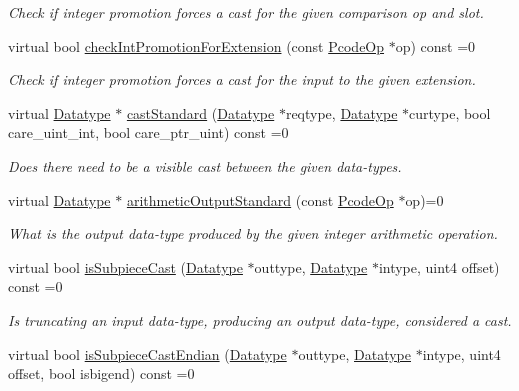 \begin{DoxyCompactItemize}
\begin{DoxyCompactList}\small\item\em Check if integer promotion forces a cast for the given comparison op and slot. \end{DoxyCompactList}\item 
virtual bool \mbox{\hyperlink{class_cast_strategy_a1d44ad4691a30115228ae37533d2c38d}{check\+Int\+Promotion\+For\+Extension}} (const \mbox{\hyperlink{class_pcode_op}{Pcode\+Op}} $\ast$op) const =0
\begin{DoxyCompactList}\small\item\em Check if integer promotion forces a cast for the input to the given extension. \end{DoxyCompactList}\item 
virtual \mbox{\hyperlink{class_datatype}{Datatype}} $\ast$ \mbox{\hyperlink{class_cast_strategy_a9ca9d31afeefca9a43cd8114333bcb21}{cast\+Standard}} (\mbox{\hyperlink{class_datatype}{Datatype}} $\ast$reqtype, \mbox{\hyperlink{class_datatype}{Datatype}} $\ast$curtype, bool care\+\_\+uint\+\_\+int, bool care\+\_\+ptr\+\_\+uint) const =0
\begin{DoxyCompactList}\small\item\em Does there need to be a visible cast between the given data-\/types. \end{DoxyCompactList}\item 
virtual \mbox{\hyperlink{class_datatype}{Datatype}} $\ast$ \mbox{\hyperlink{class_cast_strategy_ae1b79520df9f5b6dc22afb6969606054}{arithmetic\+Output\+Standard}} (const \mbox{\hyperlink{class_pcode_op}{Pcode\+Op}} $\ast$op)=0
\begin{DoxyCompactList}\small\item\em What is the output data-\/type produced by the given integer arithmetic operation. \end{DoxyCompactList}\item 
virtual bool \mbox{\hyperlink{class_cast_strategy_a1297e8653f09779c450e99ba43909e3a}{is\+Subpiece\+Cast}} (\mbox{\hyperlink{class_datatype}{Datatype}} $\ast$outtype, \mbox{\hyperlink{class_datatype}{Datatype}} $\ast$intype, uint4 offset) const =0
\begin{DoxyCompactList}\small\item\em Is truncating an input data-\/type, producing an output data-\/type, considered a cast. \end{DoxyCompactList}\item 
virtual bool \mbox{\hyperlink{class_cast_strategy_a349f166237fd4cd8f3d01b276a21138a}{is\+Subpiece\+Cast\+Endian}} (\mbox{\hyperlink{class_datatype}{Datatype}} $\ast$outtype, \mbox{\hyperlink{class_datatype}{Datatype}} $\ast$intype, uint4 offset, bool isbigend) const =0

\end{DoxyCompactItemize}
